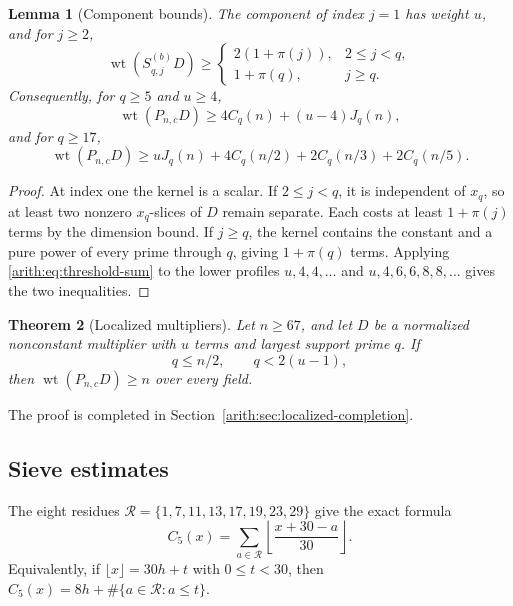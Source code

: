 \documentclass[11pt]{article}
\DeclareMathOperator{\wt}{wt}\DeclareMathOperator{\ord}{ord}
\numberwithin{equation}{section}
\newtheorem{theorem}{Theorem}[section]
\newtheorem{lemma}[theorem]{Lemma}
\theoremstyle{definition}\newtheorem{definition}[theorem]{Definition}
\theoremstyle{remark}\newtheorem{remark}[theorem]{Remark}
\begin{document}
\begin{lemma}[Component bounds]\label{arith:lem:active-prime-profile}
The component of index $j=1$ has weight $u$, and for $j\ge2$,
\[
 \wt(S^{(b)}_{q,j}D)\ge
 \begin{cases}
 2(1+\pi(j)),&2\le j<q,\\
 1+\pi(q),&j\ge q.
 \end{cases}
\]
Consequently, for $q\ge5$ and $u\ge4$,
\begin{equation}\label{arith:eq:four-component-budget}
 \wt(P_{n,c}D)\ge4C_q(n)+(u-4)J_q(n),
\end{equation}
and for $q\ge17$,
\begin{equation}\label{arith:eq:eight-component-budget}
 \wt(P_{n,c}D)\ge uJ_q(n)+4C_q(n/2)+2C_q(n/3)+2C_q(n/5).
\end{equation}
\end{lemma}
\begin{proof}
At index one the kernel is a scalar. If $2\le j<q$, it is
independent of $x_q$, so at least two nonzero $x_q$-slices of $D$
remain separate. Each costs at least $1+\pi(j)$ terms by the
dimension bound. If $j\ge q$, the kernel contains the constant and
a pure power of every prime through $q$, giving $1+\pi(q)$ terms.
Applying \eqref{arith:eq:threshold-sum} to the lower profiles
$u,4,4,\ldots$ and $u,4,6,6,8,8,\ldots$ gives the two inequalities.
\end{proof}

\begin{theorem}[Localized multipliers]\label{arith:thm:localized-expansion}
Let $n\ge67$, and let $D$ be a normalized nonconstant multiplier
with $u$ terms and largest support prime $q$. If
\[
 q\le n/2,\qquad q<2(u-1),
\]
then $\wt(P_{n,c}D)\ge n$ over every field.
\end{theorem}

The proof is completed in Section~\ref{arith:sec:localized-completion}.

\subsection{Sieve estimates}\label{arith:sec:one-step-sieve}

The eight residues
$\mathcal R=\{1,7,11,13,17,19,23,29\}$ give the exact formula
\begin{equation}\label{arith:residue-count}
 C_5(x)=\sum_{a\in\mathcal R}\left\lfloor\frac{x+30-a}{30}\right\rfloor.
\end{equation}
Equivalently, if $\lfloor x\rfloor=30h+t$ with $0\le t<30$,
then $C_5(x)=8h+\#\{a\in\mathcal R:a\le t\}$.
\end{document}
